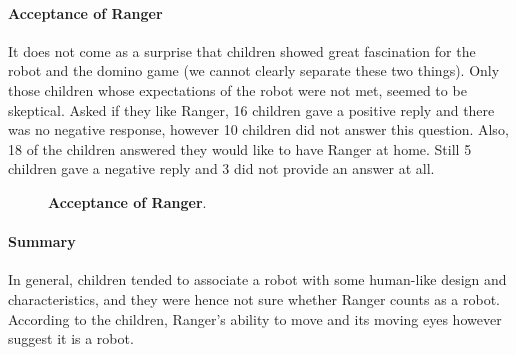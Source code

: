\documentclass{sig-alternate}
\begin{document}
\paragraph{Acceptance of Ranger}

It does not come as a surprise that children showed great fascination for the
robot and the domino game (we cannot clearly separate these two things). Only
those children whose expectations of the robot were not met, seemed to be
skeptical. Asked if they like Ranger, 16 children gave a positive reply and
there was no negative response, however 10 children did not answer this
question. Also, 18 of the children answered they would like to have Ranger at
home. Still 5 children gave a negative reply and 3 did not provide an answer at
all. 

\begin{figure}[!h]
\centering
\caption[Acceptance of Ranger]{\small \textbf{Acceptance of Ranger}.}
  \label{fig:domino-acceptance}
\end{figure}
   


\paragraph{Summary}

In general, children tended to associate a robot with some human-like design and
characteristics, and they were hence not sure whether Ranger counts as a robot.
According to the children, Ranger's ability to move and its moving eyes however
suggest it is a robot.
\end{document}
